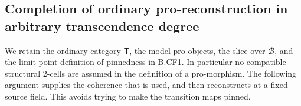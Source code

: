 \subsection{Completion of ordinary pro-reconstruction in arbitrary transcendence degree}

We retain the ordinary category \(\mathsf T\), the model pro-objects,
the slice over \(\mathcal B\), and the limit-point definition of
pinnedness in B.CF1. In particular no compatible structural 2-cells
are assumed in the definition of a pro-morphism. The following
argument supplies the coherence that is used, and then reconstructs
at a fixed source field. This avoids trying to make the transition
maps pinned.

